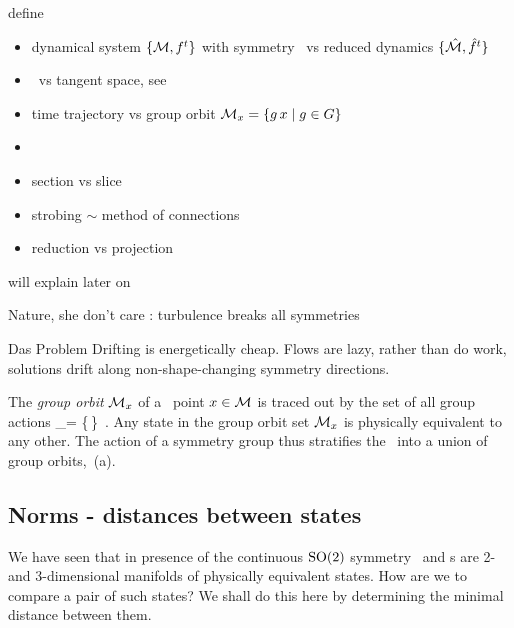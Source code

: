 define
\begin{itemize}
  \item dynamical system $\{{\cal M},f^t\}$ with symmetry \Group\
        vs reduced dynamics $\{\hat{\cal M},\hat{f}^t\}$
  \item \statesp\ vs tangent space, see 
  \item time trajectory \flowRed{\zeit}{\ssp} vs group orbit
        ${\cal M}_{x} = \{g\,x \mid g \in {\ensuremath{G}}\}$
  \item \template
  \item section {\PoincS} vs slice \pSRed
  \item strobing $\sim$ method of connections
  \item reduction vs projection
\end{itemize}
will explain later on

Nature, she don't care :
turbulence breaks all symmetries

{\Large Das Problem}
Drifting is energetically cheap.
Flows are lazy, rather than do work, solutions drift along non-shape-changing
symmetry directions.

    \color{black}\fi

The \emph{group orbit} ${\cal M}_{x} $ of a \statesp\ point $x \in {\cal M}$ is
traced out by the set of all group actions
\beq
\pS_\ssp = \{\LieEl\,\ssp \mid \LieEl \in {\Group}\}
\,.
Any state in the  group orbit set ${\cal M}_{x}$
is physically equivalent to any other. The action of a symmetry group
thus stratifies the \statesp\ into a union of group orbits,
\,{(a)}.

\subsection{Norms - distances between states}

We have seen that in presence of the continuous $\textrm{SO}(2)$ symmetry
\reqva\ and \rpo s are 2- and 3-dimensional manifolds of physically
equivalent states. How are we to compare a pair of such states? We shall
do this here by determining the minimal distance between them.

